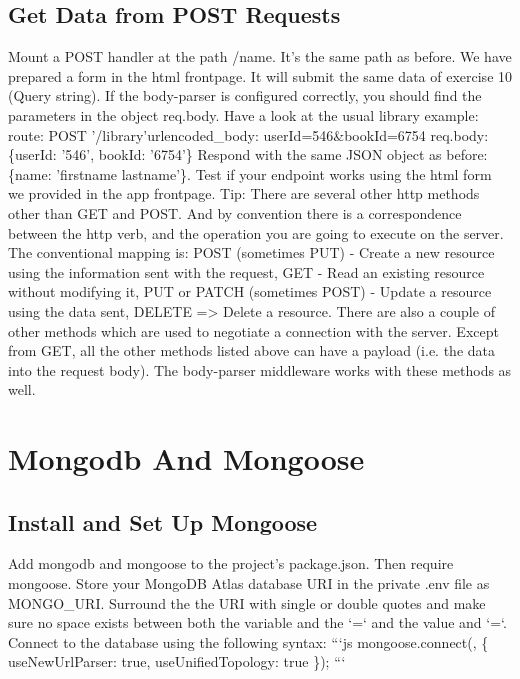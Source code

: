 \documentclass{article}%
\begin{document}
%
\subsection{Get Data from POST Requests}%
\label{subsec:GetDatafromPOSTRequests}%
Mount a POST handler at the path /name. It’s the same path as before. We have prepared a form in the html frontpage. It will submit the same data of exercise 10 (Query string). If the body{-}parser is configured correctly, you should find the parameters in the object req.body. Have a look at the usual library example:\newline%
route: POST '/library'urlencoded\_body: userId=546\&bookId=6754 req.body: \{userId: '546', bookId: '6754'\}\newline%
Respond with the same JSON object as before: \{name: 'firstname lastname'\}. Test if your endpoint works using the html form we provided in the app frontpage.\newline%
Tip: There are several other http methods other than GET and POST. And by convention there is a correspondence between the http verb, and the operation you are going to execute on the server. The conventional mapping is:\newline%
POST (sometimes PUT) {-} Create a new resource using the information sent with the request,\newline%
GET {-} Read an existing resource without modifying it,\newline%
PUT or PATCH (sometimes POST) {-} Update a resource using the data sent,\newline%
DELETE => Delete a resource.\newline%
There are also a couple of other methods which are used to negotiate a connection with the server. Except from GET, all the other methods listed above can have a payload (i.e. the data into the request body). The body{-}parser middleware works with these methods as well.\newline%

%
\newpage%
\section{Mongodb And Mongoose}%
\label{sec:MongodbAndMongoose}%
\subsection{Install and Set Up Mongoose}%
\label{subsec:InstallandSetUpMongoose}%
Add mongodb and mongoose to the project’s package.json. Then require mongoose. Store your MongoDB Atlas database URI in the private .env file as MONGO\_URI. Surround the the URI with single or double quotes and make sure no space exists between both the variable and the `=` and the value and `=`. Connect to the database using the following syntax:\newline%
```js\newline%
mongoose.connect(, \{ useNewUrlParser: true, useUnifiedTopology: true \}); \newline%
```\newline%
\end{document}

